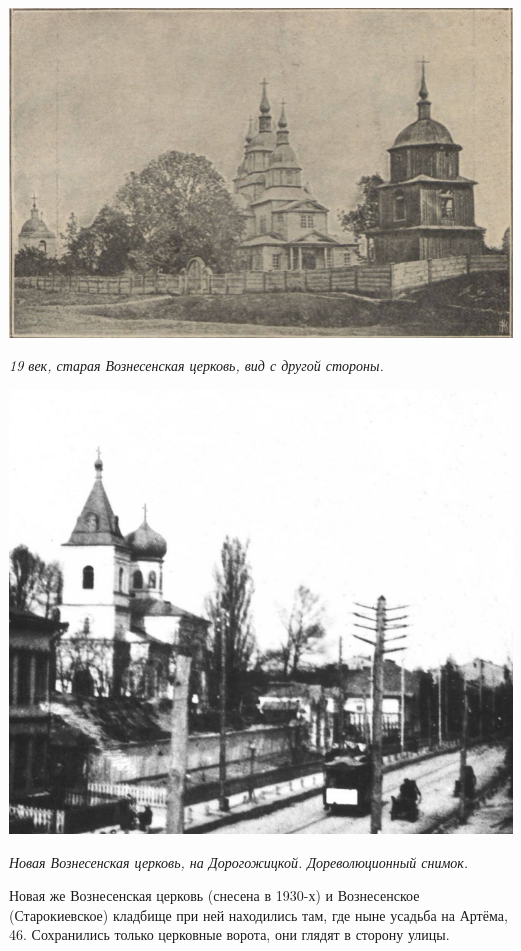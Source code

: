 \newpage
\begin{center}
\includegraphics[width=0.94\linewidth]{chast-colebanie-osnov/gora-zamkovaya-valovaya/vozncerk02.jpg}

\textit{19 век, старая Вознесенская церковь, вид с другой стороны.}
\end{center}

\begin{center}
\includegraphics[width=0.94\linewidth]{chast-colebanie-osnov/gora-zamkovaya-valovaya/vozn-nov.jpg}

\textit{Новая Вознесенская церковь, на Дорогожицкой. Дореволюционный снимок.}
\end{center}
\newpage

Новая же Вознесенская церковь (снесена в 1930-х) и Вознесенское (Старокиевское) кладбище при ней находились там, где ныне усадьба на Артёма, 46. Сохранились только церковные ворота, они глядят в сторону улицы. 

